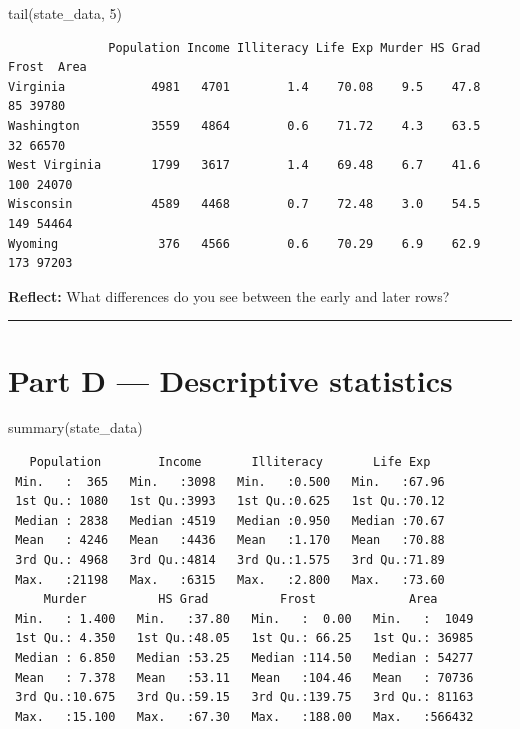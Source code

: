 \documentclass[
  letterpaper,
  DIV=11,
  numbers=noendperiod]{scrreprt}
\newenvironment{Shaded}{\begin{snugshade}}{\end{snugshade}}
\newcommand{\DecValTok}[1]{\textcolor[rgb]{0.68,0.00,0.00}{#1}}
\newcommand{\FunctionTok}[1]{\textcolor[rgb]{0.28,0.35,0.67}{#1}}
\newcommand{\NormalTok}[1]{\textcolor[rgb]{0.00,0.23,0.31}{#1}}
\begin{document}
\begin{Shaded}
\begin{Highlighting}[]
\FunctionTok{tail}\NormalTok{(state\_data, }\DecValTok{5}\NormalTok{)}
\end{Highlighting}
\end{Shaded}

\begin{verbatim}
              Population Income Illiteracy Life Exp Murder HS Grad Frost  Area
Virginia            4981   4701        1.4    70.08    9.5    47.8    85 39780
Washington          3559   4864        0.6    71.72    4.3    63.5    32 66570
West Virginia       1799   3617        1.4    69.48    6.7    41.6   100 24070
Wisconsin           4589   4468        0.7    72.48    3.0    54.5   149 54464
Wyoming              376   4566        0.6    70.29    6.9    62.9   173 97203
\end{verbatim}

\textbf{Reflect:} What differences do you see between the early and
later rows?

\begin{center}\rule{0.5\linewidth}{0.5pt}\end{center}

\section{Part D --- Descriptive
statistics}\label{part-d-descriptive-statistics}

\begin{Shaded}
\begin{Highlighting}[]
\FunctionTok{summary}\NormalTok{(state\_data)}
\end{Highlighting}
\end{Shaded}

\begin{verbatim}
   Population        Income       Illiteracy       Life Exp    
 Min.   :  365   Min.   :3098   Min.   :0.500   Min.   :67.96  
 1st Qu.: 1080   1st Qu.:3993   1st Qu.:0.625   1st Qu.:70.12  
 Median : 2838   Median :4519   Median :0.950   Median :70.67  
 Mean   : 4246   Mean   :4436   Mean   :1.170   Mean   :70.88  
 3rd Qu.: 4968   3rd Qu.:4814   3rd Qu.:1.575   3rd Qu.:71.89  
 Max.   :21198   Max.   :6315   Max.   :2.800   Max.   :73.60  
     Murder          HS Grad          Frost             Area       
 Min.   : 1.400   Min.   :37.80   Min.   :  0.00   Min.   :  1049  
 1st Qu.: 4.350   1st Qu.:48.05   1st Qu.: 66.25   1st Qu.: 36985  
 Median : 6.850   Median :53.25   Median :114.50   Median : 54277  
 Mean   : 7.378   Mean   :53.11   Mean   :104.46   Mean   : 70736  
 3rd Qu.:10.675   3rd Qu.:59.15   3rd Qu.:139.75   3rd Qu.: 81163  
 Max.   :15.100   Max.   :67.30   Max.   :188.00   Max.   :566432  
\end{verbatim}
\end{document}
